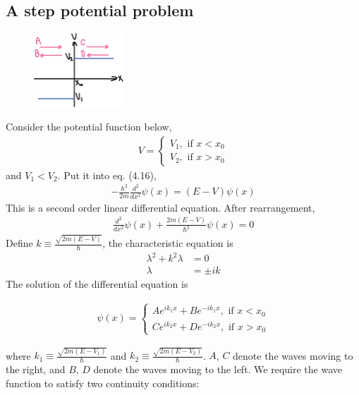 \documentclass[12pt]{book} %
\numberwithin{equation}{chapter}
\begin{document}
\subsection*{A step potential problem}
\begin{figure}
\hspace{-3cm}
\centering
\includegraphics[width=0.3\textwidth]{A step potential problem}
\end{figure}
Consider the potential function below,
\begin{align*}
V=
\begin{cases}
V_{1}, \text{ if }x<x_{0}\\
V_{2}, \text{ if }x>x_{0}
\end{cases}
\end{align*}
and $V_{1}<V_{2}$.\bigskip\newline
Put it into eq. (4.16),
\begin{align*}
-\frac{\hbar^{2}}{2m}\frac{d^{2}}{dx^{2}}\psi(x)=(E-V)\psi(x)
\end{align*}
This is a second order linear differential equation. After rearrangement,
\begin{align*}
\frac{d^{2}}{dx^{2}}\psi(x)+\frac{2m(E-V)}{\hbar^{2}}\psi(x)=0
\end{align*}
Define $k\equiv\frac{\sqrt{2m(E-V)}}{\hbar}$, the characteristic equation is
\begin{align*}
\lambda^{2}+k^{2}\lambda&=0\\
\lambda&=\pm ik
\end{align*}
The solution of the differential equation is
\begin{eqnbox}
\begin{align}
\psi(x)=
\begin{cases}
Ae^{ik_{1}x}+Be^{-ik_{1}x}, \text{ if }x<x_{0}\\
Ce^{ik_{2}x}+De^{-ik_{2}x}, \text{ if }x>x_{0}
\end{cases}
\end{align}
\end{eqnbox}
where $k_{1}\equiv\frac{\sqrt{2m(E-V_{1})}}{\hbar}$ and $k_{2}\equiv\frac{\sqrt{2m(E-V_{2})}}{\hbar}$. $A$, $C$ denote the waves moving to the right, and $B$, $D$ denote the waves moving to the left.\bigskip\newline
We require the wave function to satisfy two continuity conditions:
\end{document}
